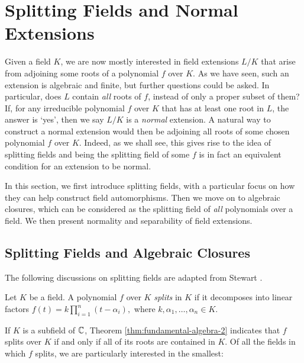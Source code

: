 \section{Splitting Fields and Normal Extensions} \label{sec:normal}

Given a field $K$, we are now mostly interested in field extensions $L/K$ that arise from adjoining some roots of a polynomial $f$ over $K$. As we have seen, such an extension is algebraic and finite, but further questions could be asked. In particular, does $L$ contain \textit{all} roots of $f$, instead of only a proper subset of them? If,  for any irreducible polynomial $f$ over $K$ that has at least one root in $L$, the answer is `yes', then we say $L/K$ is a \textit{normal} extension. 
A natural way to construct a normal extension would then be adjoining all roots of some chosen polynomial $f$ over $K$. Indeed, as we shall see, this gives rise to the idea of splitting fields and being the splitting field of some $f$ is in fact an equivalent condition for an extension to be normal. 

In this section, we first introduce splitting fields, with a particular focus on how they can help construct field automorphisms. Then we move on to algebraic closures, which can be considered as the splitting field of \textit{all} polynomials over a field. We then present normality and separability of field extensions. 



\subsection{Splitting Fields and Algebraic Closures}

The following discussions on splitting fields are adapted from Stewart \cite[Chapter~9]{Stewart}. 
\begin{definition}
    Let $K$ be a field. A polynomial $f$ over $K$ \textit{splits} in $K$ if it decomposes into linear factors $
    f(t) = k \prod _{i=1} ^n (t - \alpha_i),
    $
    where $k, \alpha_1, \ldots, \alpha_n \in K$. 
\end{definition}
If $K$ is a subfield of $\mathbb C$, Theorem \ref{thm:fundamental-algebra-2} indicates that $f$ splits over $K$ if and only if all of its roots are contained in $K$. 
Of all the fields in which $f$ splits, we are particularly interested in the smallest:

